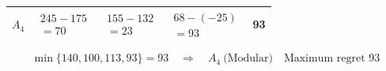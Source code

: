 {\begin{minipage}[t]{0.51\textwidth}
\begin{tabular}{@{}lcccc@{}}
    $A_4$ & $\begin{gathered}245-175\\=70\end{gathered}$ & $\begin{gathered}155-132\\=23\end{gathered}$ & $\begin{gathered}68-(-25)\\=93\end{gathered}$ & 93\\
    \bottomrule
  \end{tabular}
\end{minipage}
\[
  \min\{140,100,113,93\}=93
  \quad\Longrightarrow\quad
  \boxed{A_4\ \text{(Modular)}\quad\text{Maximum regret }93}
\]
}

\clearpage
{}
